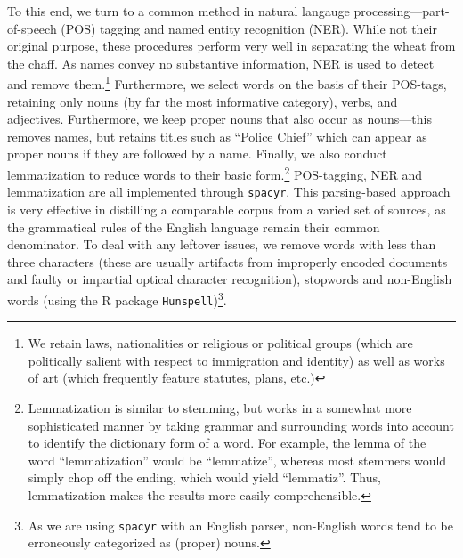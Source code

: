 \documentclass[11pt]{article}
\begin{document}
To this end, we turn to a common method in natural langauge processing---part-of-speech (POS) tagging and named entity recognition (NER). While not their original purpose, these procedures perform very well in separating the wheat from the chaff. As names convey no substantive information, NER is used to detect and remove them.\footnote{We retain laws, nationalities or religious or political groups (which are politically salient with respect to immigration and identity) as well as works of art (which frequently feature statutes, plans, etc.)} Furthermore, we select words on the basis of their POS-tags, retaining only nouns (by far the most informative category), verbs, and adjectives. Furthermore, we keep proper nouns that also occur as nouns---this removes names, but retains titles such as ``Police Chief'' which can appear as proper nouns if they are followed by a name. Finally, we also conduct lemmatization to reduce words to their basic form.\footnote{Lemmatization is similar to stemming, but works in a somewhat more sophisticated manner by taking grammar and surrounding words into account to identify the dictionary form of a word. For example, the lemma of the word ``lemmatization'' would be ``lemmatize'', whereas most stemmers would simply chop off the ending, which would yield ``lemmatiz''. Thus, lemmatization makes the results more easily comprehensible.} POS-tagging, NER and lemmatization are all implemented through \texttt{spacyr}. This parsing-based approach is very effective in distilling a comparable corpus from a varied set of sources, as the grammatical rules of the English language remain their common denominator. To deal with any leftover issues, we remove words with less than three characters (these are usually artifacts from improperly encoded documents and faulty or impartial optical character recognition), stopwords and non-English words (using the R package \texttt{Hunspell})\footnote{As we are using \texttt{spacyr} with an English parser, non-English words tend to be erroneously categorized as (proper) nouns.}.
\end{document}
